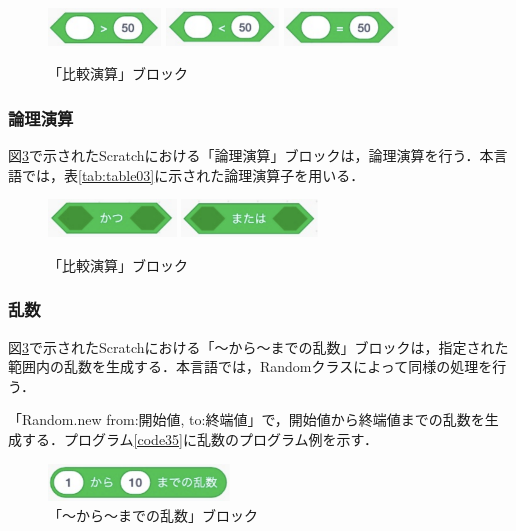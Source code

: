 \documentclass[10pt,a4j]{ltjsarticle}
\begin{document}
\begin{figure}[H]
  \centering
  \includegraphics[height=10mm]{images/over.pdf}
  \includegraphics[height=10mm]{images/less.pdf}
  \includegraphics[height=10mm]{images/equ.pdf}
  \caption{「比較演算」ブロック}
  \label{fig:com}
\end{figure}

\subsubsection{論理演算}
図\ref{fig:log}で示されたScratchにおける「論理演算」ブロックは，論理演算を行う．本言語では，表\ref{tab:table03}に示された論理演算子を用いる．

\begin{figure}[H]
  \centering
  \includegraphics[height=10mm]{images/and.pdf}
  \includegraphics[height=10mm]{images/or.pdf}
  \caption{「比較演算」ブロック}
  \label{fig:log}
\end{figure}

\subsubsection{乱数}
図\ref{fig:log}で示されたScratchにおける「〜から〜までの乱数」ブロックは，指定された範囲内の乱数を生成する．本言語では，Randomクラスによって同様の処理を行う．

「Random.new from:開始値, to:終端値」で，開始値から終端値までの乱数を生成する．プログラム\ref{code35}に乱数のプログラム例を示す．

\begin{figure}[H]
  \centering
  \includegraphics[height=10mm]{images/random.pdf}
  \caption{「〜から〜までの乱数」ブロック}
  \label{fig:log}
\end{figure}
\end{document}
